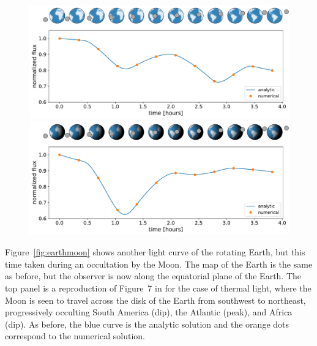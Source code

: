 \documentclass[modern]{aastex62}
\begin{document}
%

\begin{figure}[t!]
    \begin{centering}
        \includegraphics[width=\linewidth]{figures/earthmoon_emitted.pdf}
        \includegraphics[width=\linewidth]{figures/earthmoon.pdf}
    \end{centering}
\end{figure}

Figure~\ref{fig:earthmoon} shows another light curve of the rotating
Earth, but this time taken during an occultation by the Moon. The map
of the Earth is the same as before, but the observer is now along the
equatorial plane of the Earth.
The top panel is a reproduction of
Figure~7 in \citet{Luger2019} for the case of thermal light,
where the Moon is seen to travel across the
disk of the Earth from southwest to northeast, progressively occulting
South America (dip), the Atlantic (peak), and Africa (dip).
As before,
the blue curve is the analytic solution and the orange dots correspond
to the numerical solution.
\end{document}
